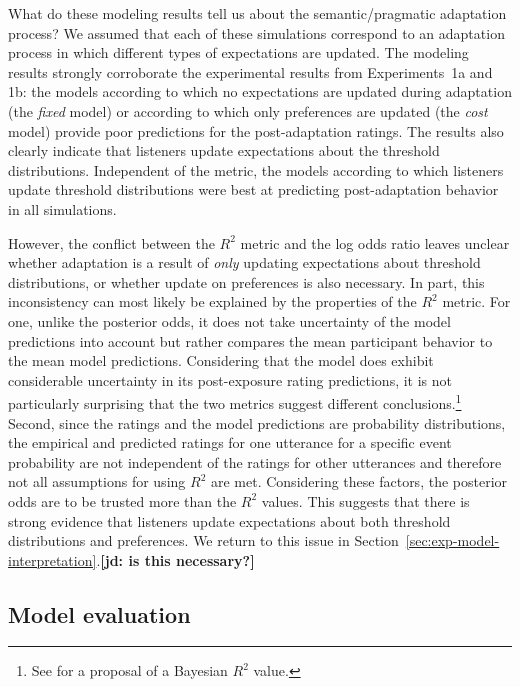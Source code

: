 \documentclass[lucida,biblatex]{sp} %
\newcommand{\jd}[1]{\textcolor{PinkyPurple}{\textbf{[jd: #1]}}}
\newcommand{\sectionref}[1]{Section~\ref{#1}}
\begin{document}
What do these modeling results tell us about the semantic/pragmatic adaptation process? 
We assumed that each of these simulations
correspond to an adaptation process in which different types of expectations are  updated.
The modeling results strongly corroborate the experimental results from Experiments~1a and 1b:
the models according to which no expectations are updated during adaptation (the \textit{fixed} model) 
or according to which only preferences are updated (the \textit{cost} model) provide poor predictions for the post-adaptation
ratings. The results also clearly indicate that listeners update expectations about the threshold distributions. Independent of
the metric, the models according to which listeners update threshold distributions were best at predicting post-adaptation
behavior in all simulations. 

However, the conflict between the $R^2$ metric and the log odds ratio leaves unclear whether adaptation is a result of \emph{only} updating expectations about threshold distributions, or whether update on preferences is also necessary. 
In part, this inconsistency can most likely be explained by the properties of the $R^2$ metric. For one, unlike the posterior odds, 
it does not take uncertainty of the model predictions into account but rather compares the mean participant behavior to the mean 
model predictions. Considering that the model does exhibit considerable uncertainty in its post-exposure rating predictions, it is not
particularly surprising that the two metrics suggest different conclusions.\footnote{See \citep{Gelman2018} for a proposal of a Bayesian $R^2$ value.}
Second, since the ratings and the model predictions are probability distributions, 
the empirical and predicted ratings for one utterance for a specific event probability are not independent 
of the ratings for other utterances and therefore not all assumptions for using $R^2$ are met. Considering these
factors, the posterior odds are to be trusted more than the $R^2$ values. This suggests that there is strong evidence that listeners 
update expectations about both {threshold distributions} and {preferences}. We return to this issue in \sectionref{sec:exp-model-interpretation}.\jd{is this necessary?}



\subsection{Model evaluation}
\end{document}
